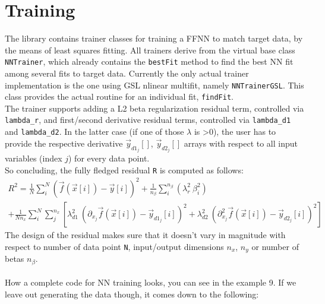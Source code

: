 \documentclass[11pt,a4paper,twoside]{article}
\begin{document}

\section{Training} %
\label{sec:training}

The library contains trainer classes for training a FFNN to match target data,
by the means of least squares fitting. All trainers derive from the virtual base class
\verb+NNTrainer+, which already contains the \verb+bestFit+ method to find the
best NN fit among several fits to target data.
Currently the only actual trainer implementation is the one using GSL nlinear
multifit, namely \verb+NNTrainerGSL+. This class provides the actual routine for
an individual fit, \verb+findFit+.
\\The trainer supports adding a L2 beta regularization residual term, controlled via
\verb+lambda_r+, and first/second derivative residual terms, controlled via
\verb+lambda_d1+ and \verb+lambda_d2+. In the latter case (if one of those
$\lambda$ is >0), the user has to
provide the respective derivative $\vec{y}_{d1_j}[]$, $\vec{y}_{d2_j}[]$ arrays with respect to all
input variables (index $j$) for every data point.
\\So concluding, the fully fledged residual \verb+R+ is computed as follows:
\begin{multline*}
  R^2 = \frac{1}{N} \sum_i^N  \left(\vec{f}(\vec{x}[i]) - \vec{y}[i]\right)^2 + \frac{1}{n_{\beta}} \sum_i^{n_{\beta}} \left( \lambda_r^2\ \beta_i^2 \right) \\
    + \frac{1}{N n_x} \sum_i^N \sum_j^{n_x} \left[ \lambda_{d1}^2\ (\partial_{x_j} \vec{f}(\vec{x}[i]) - \vec{y}_{d1_j}[i])^2  + \lambda_{d2}^2\ (\partial_{x_j}^2 \vec{f}(\vec{x}[i]) - \vec{y}_{d2_j}[i])^2 \right]
\end{multline*}
The design of the residual makes sure that it doesn't vary in magnitude with
respect to number of data point \verb+N+, input/output dimensions $n_x$,
$n_y$ or number of betas $n_{\beta}$.
\\\\How a complete code for NN training looks, you can see in the example 9.
If we leave out generating the data though, it comes down to the following:
\end{document}
